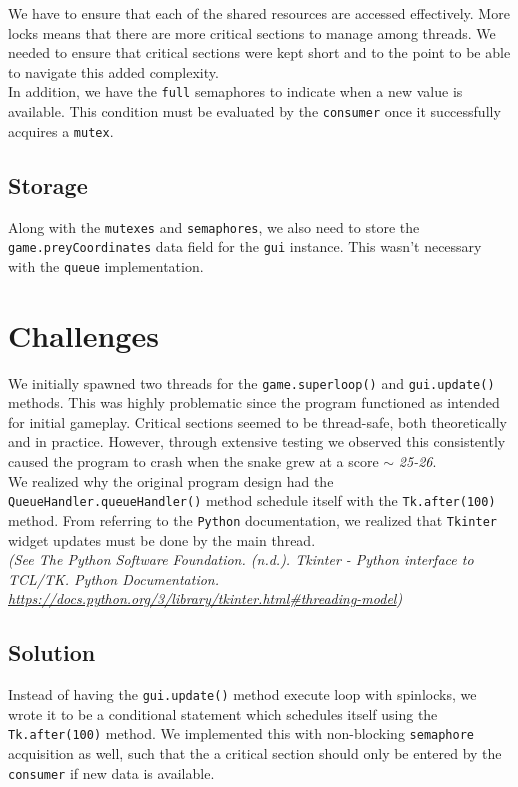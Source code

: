 \documentclass{article}
\begin{document}
We have to ensure that each of the shared resources are accessed effectively. More locks means that there are more critical sections to manage among threads.
We needed to ensure that critical sections were kept short and to the point to be able to navigate this added complexity. \\

In addition, we have the \texttt{full} semaphores to indicate when a new value is available. This condition must be evaluated by the \texttt{consumer} once it successfully acquires a \texttt{mutex}.

\subsection{Storage}

Along with the \texttt{mutexes} and \texttt{semaphores}, we also need to store the \texttt{game.preyCoordinates} data field for the \texttt{gui} instance. This wasn't necessary with the \texttt{queue} implementation.

\section{Challenges}

We initially spawned two threads for the \texttt{game.superloop()} and \texttt{gui.update()} methods.
This was highly problematic since the program functioned as intended for initial gameplay. Critical sections seemed to be thread-safe, both theoretically and in practice.
However, through extensive testing we observed this consistently caused the program to crash when the snake grew at a score $\sim$ \textit{25-26}. \\

We realized why the original program design had the \texttt{QueueHandler.queueHandler()} method schedule itself with the \texttt{Tk.after(100)} method.
From referring to the \texttt{Python} documentation, we realized that \texttt{Tkinter} widget updates must be done by the main thread. \\

\textit{(See The Python Software Foundation. (n.d.). Tkinter - Python interface to TCL/TK. Python Documentation. \href{https://docs.python.org/3/library/tkinter.html\#threading-model}{https://docs.python.org/3/library/tkinter.html\#threading-model})}

\subsection{Solution}

Instead of having the \texttt{gui.update()} method execute loop with spinlocks, we wrote it to be a conditional statement which schedules itself using the \texttt{Tk.after(100)} method.
We implemented this with non-blocking \texttt{semaphore} acquisition as well, such that the a critical section should only be entered by the \texttt{consumer} if new data is available.
\end{document}
